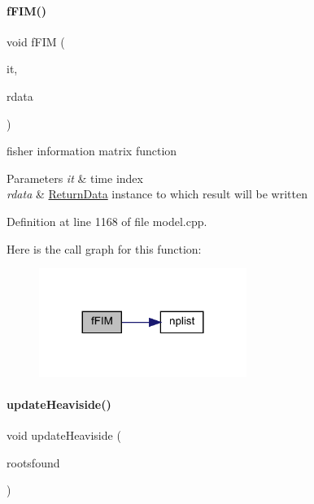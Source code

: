 \paragraph{\texorpdfstring{f\+F\+I\+M()}{fFIM()}}
{\footnotesize\ttfamily void f\+F\+IM (\begin{DoxyParamCaption}\item[{const int}]{it,  }\item[{\mbox{\hyperlink{classamici_1_1_return_data}{Return\+Data}} $\ast$}]{rdata }\end{DoxyParamCaption})}

fisher information matrix function 
\begin{DoxyParams}{Parameters}
{\em it} & time index \\
\hline
{\em rdata} & \mbox{\hyperlink{classamici_1_1_return_data}{Return\+Data}} instance to which result will be written \\
\hline
\end{DoxyParams}


Definition at line 1168 of file model.\+cpp.

Here is the call graph for this function\+:
\nopagebreak
\begin{figure}[H]
\begin{center}
\leavevmode
\includegraphics[width=191pt]{classamici_1_1_model_aba7a1237e503813d9ec7ca56413f1e1d_cgraph}
\end{center}
\end{figure}
\mbox{\label{classamici_1_1_model_ae053072690046bd24225447de93a9e84}} 
\paragraph{\texorpdfstring{update\+Heaviside()}{updateHeaviside()}}
{\footnotesize\ttfamily void update\+Heaviside (\begin{DoxyParamCaption}\item[{const std\+::vector$<$ int $>$ \&}]{rootsfound }\end{DoxyParamCaption})}

